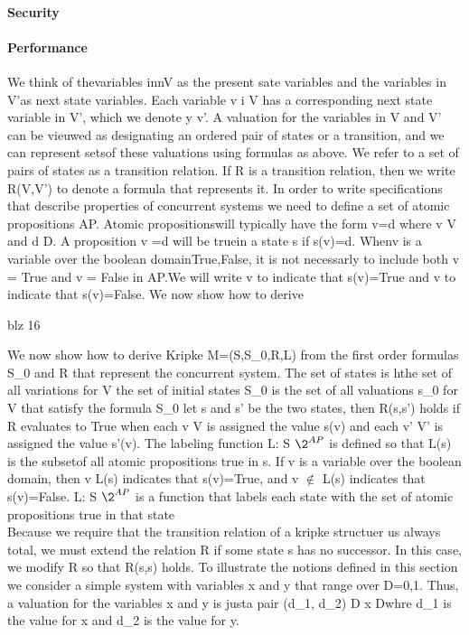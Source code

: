 \paragraph{Security}

\paragraph{Performance}

 We think of thevariables innV as the present sate variables and the variables in V'as next state variables. Each variable v i V has a corresponding next state variable in V', which we denote y v'. A valuation for the variables in V and V' can be vieuwed as designating an ordered pair of states or a transition, and we can represent setsof these valuations using formulas as above. We refer to a set of pairs of states as a transition relation. If R is a transition relation, then we write R(V,V') to denote a formula that represents it.
 In order to write specifications that describe properties of concurrent systems we need to define a set of atomic propositions AP. Atomic propositionswill typically have the form v=d where v \in V and d \in D. A proposition v =d will be truein a state s if s(v)=d. Whenv is a variable over the  boolean domain{True,False}, it is not necessarly to include both v = True and  v = False in AP.We will write v to indicate that s(v)=True and \neq v to indicate that s(v)=False.
 We now show how to derive
 
 blz 16
 
 We now show how to derive Kripke M=(S,S_0,R,L) from the first order formulas S_0 and R that represent the concurrent system.
 The set of states is hthe set of all variations	for V
 the set of initial states S_0 is the set of all valuations s_0 for V that satisfy the formula S_0
 let s and s' be the two states, then R(s,s') holds if R evaluates to True when each v \in V is assigned the value s(v) and each v' \in  V' is assigned the value s'(v).
 The labeling function L: S \to  $\2^{AP}$ is defined so that L(s) is the subsetof all atomic propositions true in s. If v is a variable over the boolean domain, then v \in L(s) indicates that s(v)=True, and v $\notin$  L(s) indicates that s(v)=False.
 L: S \to  $\2^{AP}$  is a function that labels each state with the set of atomic propositions true in that state\\
 
Because we require that the transition relation of a kripke structuer us always total, we must extend the relation R if some state s has no successor. In this case, we modify R so that R(s,s) holds.
To illustrate the notions defined in this section we consider a simple system with variables x and y that range over D={0,1}. Thus, a valuation for the variables x and y is justa pair (d_1, d_2) \in D x Dwhre d_1 is the value for x and d_2 is the value for y.

